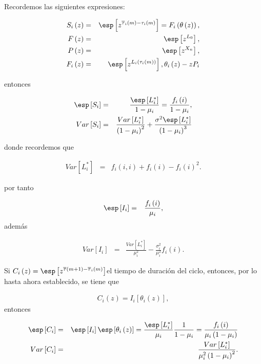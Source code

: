 Recordemos las siguientes expresiones:

\begin{eqnarray*}
S_{i}\left(z\right)&=&\esp\left[z^{\overline{\tau}_{i}\left(m\right)-\tau_{i}\left(m\right)}\right]=F_{i}\left(\theta\left(z\right)\right),\\
F\left(z\right)&=&\esp\left[z^{L_{0}}\right],\\
P\left(z\right)&=&\esp\left[z^{X_{n}}\right],\\
F_{i}\left(z\right)&=&\esp\left[z^{L_{i}\left(\tau_{i}\left(m\right)\right)}\right],
\theta_{i}\left(z\right)-zP_{i}
\end{eqnarray*}

entonces 

\begin{eqnarray*}
\esp\left[S_{i}\right]&=&\frac{\esp\left[L_{i}^{*}\right]}{1-\mu_{i}}=\frac{f_{i}\left(i\right)}{1-\mu_{i}},\\
Var\left[S_{i}\right]&=&\frac{Var\left[L_{i}^{*}\right]}{\left(1-\mu_{i}\right)^{2}}+\frac{\sigma^{2}\esp\left[L_{i}^{*}\right]}{\left(1-\mu_{i}\right)^{3}}
\end{eqnarray*}

donde recordemos que

\begin{eqnarray*}
Var\left[L_{i}^{*}\right]&=&f_{i}\left(i,i\right)+f_{i}\left(i\right)-f_{i}\left(i\right)^{2}.
\end{eqnarray*}

 por tanto


\begin{eqnarray*}
\esp\left[I_{i}\right]&=&\frac{f_{i}\left(i\right)}{\mu_{i}},
\end{eqnarray*}
adem\'as

\begin{eqnarray*}
Var\left[I_{i}\right]&=&\frac{Var\left[L_{i}^{*}\right]}{\mu_{i}^{2}}-\frac{\sigma_{i}^{2}}{\mu_{i}^{2}}f_{i}\left(i\right).
\end{eqnarray*}


Si  $C_{i}\left(z\right)=\esp\left[z^{\overline{\tau}\left(m+1\right)-\overline{\tau}_{i}\left(m\right)}\right]$el tiempo de duraci\'on del ciclo, entonces, por lo hasta ahora establecido, se tiene que

\begin{eqnarray*}
C_{i}\left(z\right)=I_{i}\left[\theta_{i}\left(z\right)\right],
\end{eqnarray*}
entonces

\begin{eqnarray*}
\esp\left[C_{i}\right]&=&\esp\left[I_{i}\right]\esp\left[\theta_{i}\left(z\right)\right]=\frac{\esp\left[L_{i}^{*}\right]}{\mu_{i}}\frac{1}{1-\mu_{i}}=\frac{f_{i}\left(i\right)}{\mu_{i}\left(1-\mu_{i}\right)}\\
Var\left[C_{i}\right]&=&\frac{Var\left[L_{i}^{*}\right]}{\mu_{i}^{2}\left(1-\mu_{i}\right)^{2}}.
\end{eqnarray*}

